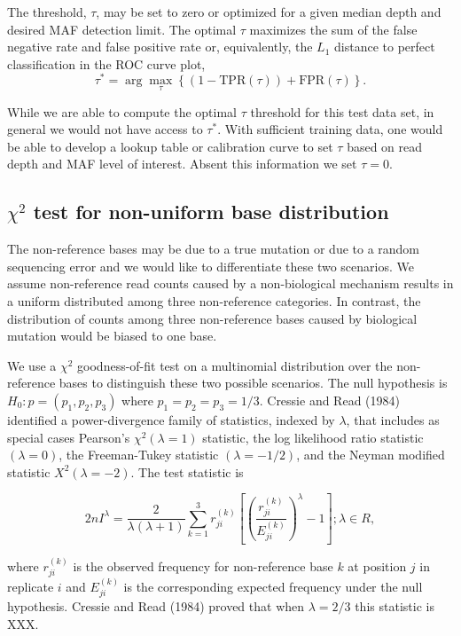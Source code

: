 \documentclass[11pt,reqno]{amsart}
\begin{document}
The threshold, $\tau$, may be set to zero or optimized for a given median depth and desired MAF detection limit. The optimal $\tau$ maximizes the sum of the false negative rate and false positive rate or, equivalently,  the $L_1$ distance to perfect classification in the ROC curve plot,
\begin{equation}
	\tau^* = \arg\max_\tau \left\{ (1-\text{TPR}(\tau)) + \text{FPR}(\tau) \right\}.
\end{equation}

While we are able to compute the optimal $\tau$ threshold for this test data set, in general we would not have access to $\tau^*$. With sufficient training data, one would be able to develop a lookup table or calibration curve to set $\tau$ based on read depth and MAF level of interest. Absent this information we set $\tau = 0$.


\subsection{$\chi^2$ test for non-uniform base distribution}

The non-reference bases may be due to a true mutation or due to a random sequencing error and we would like to differentiate these two scenarios. We assume non-reference read counts caused by a non-biological mechanism results in a uniform distributed among three non-reference categories. In contrast, the distribution of counts among three non-reference bases caused by biological mutation would be biased to one base.

We use a $\chi^2$ goodness-of-fit test on a multinomial distribution over the non-reference bases to distinguish these two possible scenarios. The null hypothesis is $H_0: p = (p_1, p_2, p_3)$ where $p_1=p_2=p_3=1/3$. Cressie and Read (1984) identified a power-divergence family of statistics, indexed by $\lambda$, that includes as special cases Pearson's $\chi^2 (\lambda = 1)$ statistic, the log likelihood ratio statistic $(\lambda = 0)$, the Freeman-Tukey statistic $(\lambda = -1/2)$, and the Neyman modified statistic $X^2 (\lambda = -2)$. The test statistic is

\begin{equation}
 2nI^\lambda = \frac{2}{\lambda(\lambda+1)}\sum_{k=1}^3 r_{ji}^{(k)} \left[\left(\frac{r_{ji}^{(k)}}{E_{ji}^{(k)}}\right)^\lambda-1\right];\lambda \in R,
\end{equation}

where $r_{ji}^{(k)}$ is the observed frequency for non-reference base $k$ at position $j$ in replicate $i$ and $E_{ji}^{(k)}$ is the corresponding expected frequency under the null hypothesis. Cressie and Read (1984) proved that when $\lambda = 2/3$ this statistic is XXX.
\end{document}
